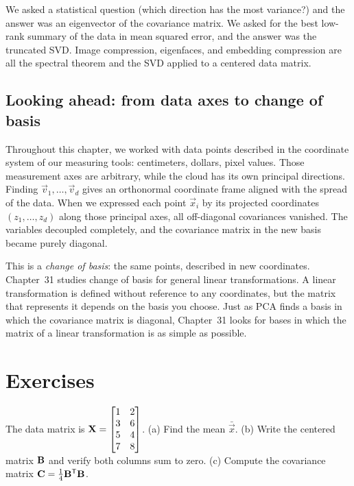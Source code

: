 \begin{aestheticbox}
We asked a statistical question (which direction has the most variance?) and the
answer was an eigenvector of the covariance matrix. We asked for the best
low-rank summary of the data in mean squared error, and the answer was the truncated
SVD. Image compression, eigenfaces, and embedding compression are all the spectral
theorem and the SVD applied to a centered data matrix.
\end{aestheticbox}

\subsection*{Looking ahead: from data axes to change of basis}

Throughout this chapter, we worked with data points described in the coordinate
system of our measuring tools: centimeters, dollars, pixel values. Those
measurement axes are arbitrary, while the cloud has its own principal
directions. Finding $\vec v_1,\dots,\vec v_d$ gives an orthonormal coordinate
frame aligned with the spread of the data.
When we expressed each point $\vec x_i$ by its projected coordinates
$(z_1,\dots,z_d)$ along those principal axes, all
off-diagonal covariances vanished. The variables decoupled completely, and the
covariance matrix in the new basis became purely diagonal.

This is a \emph{change of basis}: the same points, described in new coordinates.
Chapter~31 studies change of basis for general linear transformations. A linear
transformation is defined without reference to any coordinates, but the matrix that
represents it depends on the basis you choose. Just as PCA finds a basis in which the
covariance matrix is diagonal, Chapter~31 looks for bases in which the matrix of a
linear transformation is as simple as possible.

\section*{Exercises}

\begin{exercise}\label{ch30:ex-center}
The data matrix is $\mathbf{X}=\begin{bmatrix}1&2\\3&6\\5&4\\7&8\end{bmatrix}$.
(a) Find the mean $\bar{\vec x}$. (b) Write the centered matrix $\mathbf{B}$ and verify
both columns sum to zero. (c) Compute the covariance matrix $\mathbf{C}=\tfrac14\mathbf{B}^{\mathsf{T}}\mathbf{B}$.
\end{exercise}

